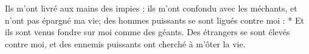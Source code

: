 Ils m’ont livré aux mains des impies ; ils m’ont confondu avec les méchants, et n’ont pas épargné ma vie; des hommes puissants se sont ligués contre moi : * Et ils sont venus fondre sur moi comme des géants.
\versseparator
Des étrangers se sont élevés contre moi, et des ennemis puissants ont cherché à m’ôter la vie.